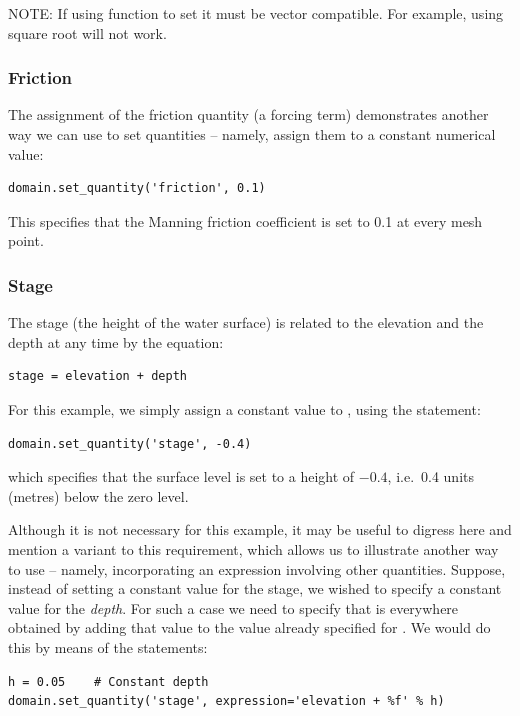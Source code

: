 \documentclass{manual}
\begin{document}
NOTE: If using function to set  it must be vector
compatible. For example, using square root will not work.

\subsubsection{Friction}

The assignment of the friction quantity (a forcing term)
demonstrates another way we can use  to set
quantities -- namely, assign them to a constant numerical value:

\begin{verbatim}
domain.set_quantity('friction', 0.1)
\end{verbatim}

This specifies that the Manning friction coefficient is set to 0.1
at every mesh point.

\subsubsection{Stage}

The stage (the height of the water surface) is related to the
elevation and the depth at any time by the equation:

\begin{verbatim}
stage = elevation + depth
\end{verbatim}

For this example, we simply assign a constant value to ,
using the statement:

\begin{verbatim}
domain.set_quantity('stage', -0.4)
\end{verbatim}

which specifies that the surface level is set to a height of $-0.4$,
i.e.\ 0.4 units (metres) below the zero level.

Although it is not necessary for this example, it may be useful to
digress here and mention a variant to this requirement, which allows
us to illustrate another way to use  -- namely,
incorporating an expression involving other quantities. Suppose,
instead of setting a constant value for the stage, we wished to
specify a constant value for the \emph{depth}. For such a case we
need to specify that  is everywhere obtained by adding
that value to the value already specified for . We
would do this by means of the statements:

\begin{verbatim}
h = 0.05    # Constant depth
domain.set_quantity('stage', expression='elevation + %f' % h)
\end{verbatim}
\end{document}
